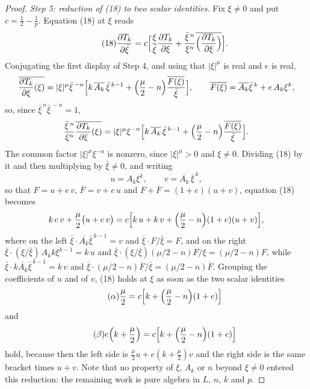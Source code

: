 \begin{proof}
\emph{Step 5: reduction of (18) to two scalar identities.}  Fix $\xi\neq0$ and
put $c=\tfrac12-\tfrac1p$.  Equation (18) at $\xi$ reads
\begin{equation}\tag{18}
  \frac{\partial T_k}{\partial\bar\xi}
  =c\Bigl[\frac{\xi}{\bar\xi}\frac{\partial T_k}{\partial\xi}
    +\frac{\bar\xi^{\,n}}{\xi^{n}}
      \overline{\Bigl(\frac{\partial T_k}{\partial\xi}\Bigr)}\Bigr].
\end{equation}
Conjugating the first display of Step 4, and using that $|\xi|^{\mu}$ is real
and $e$ is real,
\[
  \overline{\frac{\partial T_k}{\partial\xi}(\xi)}
  =|\xi|^{\mu}\bar\xi^{\,-n}\Bigl[k\,\overline{A_k}\,\bar\xi^{\,k-1}
    +\Bigl(\frac{\mu}{2}-n\Bigr)\frac{\overline{F(\xi)}}{\bar\xi}\Bigr],
  \qquad
  \overline{F(\xi)}=\overline{A_k}\bar\xi^{\,k}+e\,A_k\xi^{k},
\]
so, since $\bar\xi^{\,n}\bar\xi^{\,-n}=1$,
\[
  \frac{\bar\xi^{\,n}}{\xi^{n}}\overline{\frac{\partial T_k}{\partial\xi}(\xi)}
  =|\xi|^{\mu}\xi^{-n}\Bigl[k\,\overline{A_k}\,\bar\xi^{\,k-1}
    +\Bigl(\frac{\mu}{2}-n\Bigr)\frac{\overline{F(\xi)}}{\bar\xi}\Bigr].
\]
The common factor $|\xi|^{\mu}\xi^{-n}$ is nonzero, since $|\xi|^{\mu}>0$ and
$\xi\neq0$.  Dividing (18) by it and then multiplying by $\bar\xi\neq0$, and
writing
\[
  u=A_k\xi^{k},\qquad v=\overline{A_k}\,\bar\xi^{\,k},
\]
so that $F=u+e\,v$, $\overline{F}=v+e\,u$ and $F+\overline{F}=(1+e)(u+v)$,
equation (18) becomes
\[
  k\,e\,v+\frac{\mu}{2}\bigl(u+e\,v\bigr)
  =c\Bigl[k\,u+k\,v+\Bigl(\frac{\mu}{2}-n\Bigr)(1+e)(u+v)\Bigr],
\]
where on the left $\bar\xi\cdot\overline{A_k}\bar\xi^{\,k-1}=v$ and
$\bar\xi\cdot F/\bar\xi=F$, and on the right
$\bar\xi\cdot(\xi/\bar\xi)\,A_k k\xi^{k-1}=k\,u$ and
$\bar\xi\cdot(\xi/\bar\xi)(\mu/2-n)F/\xi=(\mu/2-n)F$, while
$\bar\xi\cdot k\overline{A_k}\bar\xi^{\,k-1}=k\,v$ and
$\bar\xi\cdot(\mu/2-n)\overline{F}/\bar\xi=(\mu/2-n)\overline{F}$.  Grouping
the coefficients of $u$ and of $v$, (18) holds at $\xi$ as soon as the two
scalar identities
\begin{equation}\tag{$\alpha$}
  \frac{\mu}{2}=c\Bigl[k+\Bigl(\frac{\mu}{2}-n\Bigr)(1+e)\Bigr]
\end{equation}
and
\begin{equation}\tag{$\beta$}
  e\Bigl(k+\frac{\mu}{2}\Bigr)=c\Bigl[k+\Bigl(\frac{\mu}{2}-n\Bigr)(1+e)\Bigr]
\end{equation}
hold, because then the left side is $\tfrac{\mu}{2}u+e(k+\tfrac{\mu}{2})v$ and
the right side is the same bracket times $u+v$.  Note that no property of
$\xi$, $A_k$ or $n$ beyond $\xi\neq0$ entered this reduction: the remaining
work is pure algebra in $L$, $n$, $k$ and $p$.


\end{proof}

